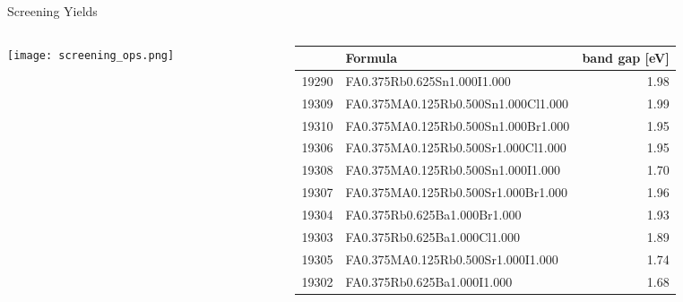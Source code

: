 \documentclass[10pt, aspectratio=169, presentation]{beamer}
\begin{document}
\begin{frame}[label={sec:org0a19ef5}]{Screening Yields}
\begin{columns}
\begin{column}{0.3\columnwidth}
\begin{center}
\texttt{[image: screening\_ops.png]}
\end{center}
\end{column}

\begin{column}{0.7\columnwidth}
\scriptsize
\begin{center}
\begin{tabular}{rlr}
 & Formula & band gap [eV]\\[0pt]
\hline
19290 & FA0.375Rb0.625Sn1.000I1.000 & 1.98\\[0pt]
19309 & FA0.375MA0.125Rb0.500Sn1.000Cl1.000 & 1.99\\[0pt]
19310 & FA0.375MA0.125Rb0.500Sn1.000Br1.000 & 1.95\\[0pt]
19306 & FA0.375MA0.125Rb0.500Sr1.000Cl1.000 & 1.95\\[0pt]
19308 & FA0.375MA0.125Rb0.500Sn1.000I1.000 & 1.70\\[0pt]
19307 & FA0.375MA0.125Rb0.500Sr1.000Br1.000 & 1.96\\[0pt]
19304 & FA0.375Rb0.625Ba1.000Br1.000 & 1.93\\[0pt]
19303 & FA0.375Rb0.625Ba1.000Cl1.000 & 1.89\\[0pt]
19305 & FA0.375MA0.125Rb0.500Sr1.000I1.000 & 1.74\\[0pt]
19302 & FA0.375Rb0.625Ba1.000I1.000 & 1.68\\[0pt]
\end{tabular}
\end{center}

 
\begin{center}

\end{center}
\end{column}
\end{columns}
\end{frame}
\end{document}
